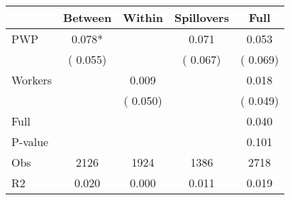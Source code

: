 
\begin{tabular}{l*{4}{c}}\hline&\multicolumn{1}{c}{Between}&\multicolumn{1}{c}{Within}&\multicolumn{1}{c}{Spillovers}&\multicolumn{1}{c}{Full}\\ \hline
 PWP           &              0.078*      &                                               &        0.071 &         0.053                            \\ 
                               &        (       0.055)           &                                       &       (       0.067)     &      (       0.069)                                           \\ 
 Workers       &                                               &        0.009    &                                &             0.018                            \\ 
                               &                                               & (       0.050)                  &                                        &      (       0.049)                                           \\ 
\hline                                                                                                                                                                                                                                            
 Full                  &                                               &                                               &                                        &             0.040                                     \\ 
 P-value               &                                               &                                               &                                        &             0.101                                           \\ 
 Obs                   &               2126               &       1924                       &       1386                &              2718                                               \\ 
 R2                    &                      0.020              &              0.000                      &              0.011               &                     0.019                                              \\ 
\hline \end{tabular}                                                                                                                                                                                                              